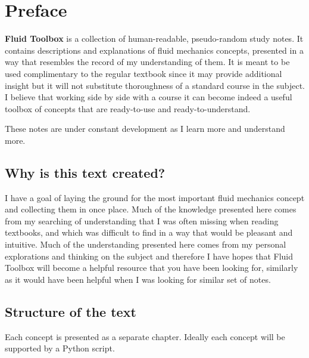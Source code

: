 \documentclass[10pt]{report}
\begin{document}
\setlength{\parskip}{0.6em}
\setlength{\parindent}{0cm}

\tableofcontents

\chapter*{Preface}



\textbf{Fluid Toolbox } is a collection of human-readable, pseudo-random study notes. It contains descriptions and explanations of fluid mechanics concepts, presented in a way that resembles the record of my understanding of them. It is meant to be used complimentary to the regular textbook since it may provide additional insight but it will not substitute thoroughness of a standard course in the subject. I believe that working side by side with a course it can become indeed a useful toolbox of concepts that are ready-to-use and ready-to-understand.

These notes are under constant development as I learn more and understand more.

\section*{Why is this text created?}

I have a goal of laying the ground for the most important fluid mechanics concept and collecting them in once place. Much of the knowledge presented here comes from my searching of understanding that I was often missing when reading textbooks, and which was difficult to find in a way that would be pleasant and intuitive. Much of the understanding presented here comes from my personal explorations and thinking on the subject and therefore I have hopes that Fluid Toolbox will become a helpful resource that you have been looking for, similarly as it would have been helpful when I was looking for similar set of notes.

\section*{Structure of the text}

Each concept is presented as a separate chapter. Ideally each concept will be supported by a Python script.
\end{document}
